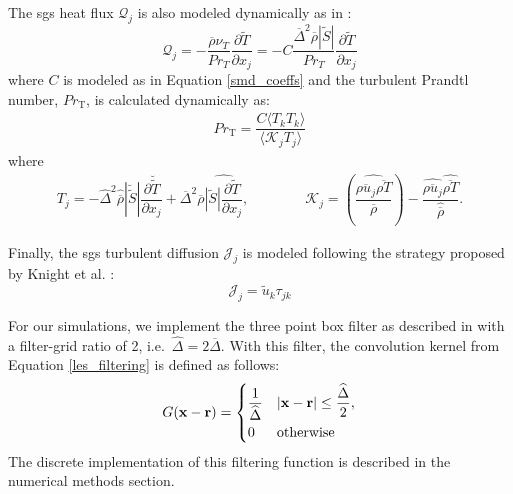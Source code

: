 The \gls{sgs} heat flux $\mathcal{Q}_j$ is also modeled dynamically as in \cite{LES_Comp}:
\begin{equation} \label{sgs_heat_flux}
\mathcal{Q}_j = - \dfrac{\overline{\rho}\nu_T}{Pr_T} \dfrac{\partial \widetilde{T}}{\partial x_j} = - C\dfrac{\overline{\Delta}^2 \overline{\rho}  |\widetilde{S}|}{Pr_T} \dfrac{\partial \widetilde{T}}{\partial x_j} 
\end{equation}
where $C$ is modeled as in Equation \ref{smd_coeffs} and the turbulent Prandtl number, $Pr_\text{T}$, is calculated dynamically as:
\begin{equation}
\begin{aligned}
	Pr_\text{T} = \dfrac{C \langle T_k T_k  \rangle}{\langle \mathcal{K}_j T_j \rangle}
\end{aligned}
\end{equation}
where 
\begin{equation}
\begin{aligned}
	T_j = - \widehat{\Delta}^2  \widehat{\overline{\rho}} |\breve{\widetilde{S}}| \dfrac{\partial \breve{\widetilde{T}}}{\partial x_j} +  \overline{\Delta}^2  \overline{\rho} \widehat{|\widetilde{S}| \dfrac{\partial \widetilde{T}}{\partial x_j}}, \qquad \qquad \mathcal{K}_j = \left( \dfrac{ \widehat{\overline{\rho u_j} \overline{\rho T}}}{\overline{\rho}} \right) - \dfrac{ \widehat{\overline{\rho u_j}} \widehat{ \overline{\rho T}}}{\widehat{\overline{\rho}}}.
\end{aligned}
\end{equation}

Finally, the \gls{sgs} turbulent diffusion $\mathcal{J}_j$ is modeled following the strategy proposed by Knight et al. \cite{}:
\begin{equation} \label{sgs_turb_diff}
\mathcal{J}_j = \widetilde{u}_k \tau_{jk}
\end{equation}

For our simulations, we implement the three point box filter as described in \cite{filter} with a filter-grid ratio of 2, i.e.\  $\widehat{\Delta}=2\overline{\Delta}$. With this filter, the convolution kernel from Equation \ref{les_filtering} is defined as follows: 
\begin{equation}
G(\vb{x} - \vb{r}) = 
\begin{cases} 
      \dfrac{1}{\widehat{\Delta}} & |\vb{x} - \vb{r}|\leq \dfrac{\widehat{\Delta}}{2}, \vspace{2pt}\\ 
      0 & \text{otherwise}
   \end{cases}
\end{equation}
The discrete implementation of this filtering function is described in the numerical methods section. 

